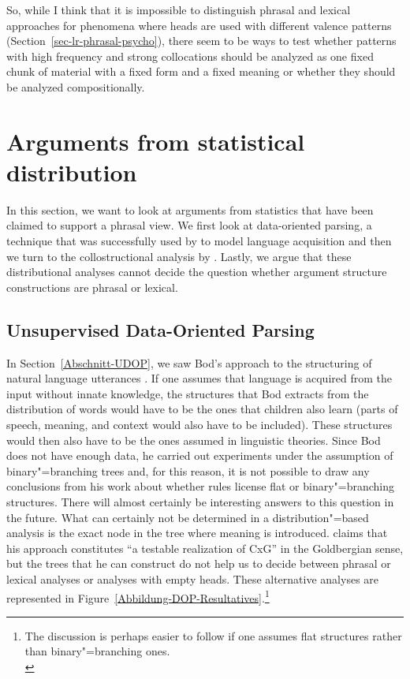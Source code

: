 \begin{exe}
\begin{xlist}[iv.]
\begin{exe}
\begin{xlist}[iv.]
So, while I think that it is impossible to distinguish phrasal and lexical approaches for phenomena
where heads are used with different valence patterns (Section~\ref{sec-lr-phrasal-psycho}), there seem to be ways to test whether patterns
with high frequency and strong collocations should be analyzed as one fixed chunk of material with a
fixed form and a fixed meaning or whether they should be analyzed compositionally.




\section{Arguments from statistical distribution}
\label{stat-sec}

In this section, we want to look at arguments from statistics that have been claimed to support a phrasal
view.  We first look at data-oriented parsing, a technique that was successfully used by
\citet{Bod2009a} to model language acquisition and then we turn to the collostructional analysis by
\citet{SG2009a}.  Lastly, we argue that these distributional analyses cannot decide the question
whether argument structure constructions are phrasal or lexical.

\subsection{Unsupervised Data-Oriented Parsing}
\label{Abschnitt-U-Dop-phrasal}


In Section~\ref{Abschnitt-UDOP},
we saw Bod's approach to the structuring of natural language utterances \citeyearpar{Bod2009a}.
If one assumes that language is acquired from the input without innate knowledge, the structures
that Bod extracts from the distribution of words would have to be the ones that children also learn
(parts of speech, meaning, and context would also have to be included). These structures would then
also have to be the ones assumed in linguistic theories. Since Bod does not have enough data, he
carried out experiments under the assumption of binary"=branching trees and, for this reason, it is
not possible to draw any conclusions from his work about whether rules license flat or
binary"=branching structures. There will almost certainly be interesting answers to this question in
the future. What can certainly not be determined in a distribution"=based analysis is the exact node
in the tree where meaning is introduced. \citet[]{Bod2009b} claims that his approach
constitutes ``a testable realization of CxG'' in the Goldbergian sense, but the trees that he can
construct do not help us to decide between phrasal or lexical analyses or analyses with empty
heads. These alternative analyses are represented in
Figure~\vref{Abbildung-DOP-Resultatives}.\footnote{ 
The discussion is perhaps easier to follow if one assumes flat structures rather than binary"=branching ones.\\

}
\end{xlist}
\end{exe}
\end{xlist}
\end{exe}
